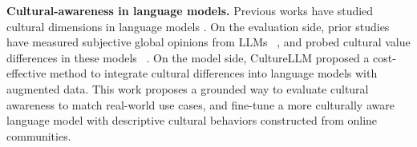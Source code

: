 \documentclass{article} %
\begin{document}
\noindent\textbf{Cultural-awareness in language models.}
Previous works have studied cultural dimensions in language models \citep{gutierrez2016detecting, ramezani2023knowledge, jiang-etal-2020-x, adewole2021dialoguebased, yao2023empowering, li2024culturellm, Cao, liu2021visually, hämmerl2022multilingual, huang2023culturally, wang2023countries, köksal2023languageagnostic}. %
On the evaluation side, prior studies have measured subjective global opinions from LLMs ~\citep{Durmus, santurkar2023whose}, and probed cultural value differences in these models ~\citep{arora2022probing, yin2022geomlama, roberts2023gpt4geo}.  %
On the model side, CultureLLM \citep{li2024culturellm} proposed a cost-effective method to integrate cultural differences into language models with augmented data. This work proposes a grounded way to evaluate cultural awareness to match real-world use cases, and fine-tune a more culturally aware language model with descriptive cultural behaviors constructed from online communities. 
\end{document}
